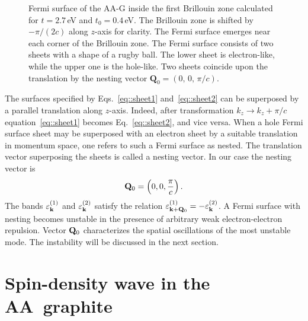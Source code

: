 \documentclass[prb,twocolumn,showpacs,aps,superscriptaddress,floatfix]{revtex4}
\begin{document}
\begin{figure}[t]
\caption{Fermi surface of the AA-G inside the first Brillouin zone
calculated for
$t=2.7$\,eV
and
$t_0=0.4$\,eV.
The Brillouin zone is shifted by
$-\pi/(2c)$
along
$z$-axis for clarity. The Fermi surface emerges near each corner of the
Brillouin zone. The Fermi surface consists of two sheets with a shape of a
rugby ball. The lower sheet is electron-like, while the upper one is the
hole-like. Two sheets coincide upon the translation by the nesting vector
$\mathbf{Q}_0=(0,\,0,\,\pi/c)$.
\label{FigFermiSurface}}
\end{figure}

The surfaces specified by
Eqs.~\eqref{eq::sheet1}
and~\eqref{eq::sheet2}
can be superposed by a parallel translation along
$z$-axis.
Indeed, after transformation
$k_z \rightarrow k_z + \pi/c$
equation~\eqref{eq::sheet1}
becomes
Eq.~\eqref{eq::sheet2},
and vice versa. When a hole Fermi surface sheet may be superposed with an
electron sheet by a suitable translation in momentum space, one refers to
such a Fermi surface as nested. The translation vector superposing the
sheets is called a nesting vector. In our case the nesting vector is
\begin{eqnarray}
\label{eq::nest_vect}
{\bf Q}_0 = \left(0, 0, \frac{\pi}{c} \right).
\end{eqnarray}
The bands
$\varepsilon^{(1)}_{\bf k}$
and
$\varepsilon^{(2)}_{\bf k}$
satisfy the relation
$\varepsilon^{(1)}_{{\bf k}+\mathbf{Q}_0}=-\varepsilon^{(2)}_{\bf k}$.
A Fermi surface with nesting becomes unstable in the presence of arbitrary
weak electron-electron repulsion. Vector
${\bf Q}_0$
characterizes the spatial oscillations of the most unstable mode. The
instability will be discussed in the next section.

\section{Spin-density wave in the AA~graphite}
\label{sec::mean_f}
\end{document}

